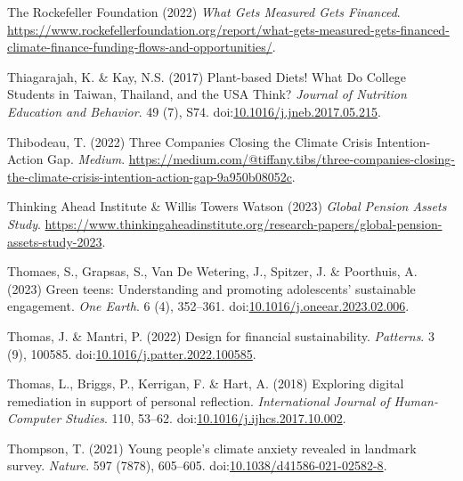 \documentclass[
  letterpaper,
  DIV=11,
  numbers=noendperiod]{scrartcl}
\newlength{\cslhangindent}
\newenvironment{CSLReferences}[2] %
 {\begin{list}{}{%
  \setlength{\itemindent}{0pt}
  \setlength{\leftmargin}{0pt}
  \setlength{\parsep}{0pt}
  \ifodd #1
   \setlength{\leftmargin}{\cslhangindent}
   \setlength{\itemindent}{-1\cslhangindent}
  \fi
  \setlength{\itemsep}{#2\baselineskip}}}
 {\end{list}}
\begin{document}
\begin{CSLReferences}{0}{1}
The Rockefeller Foundation (2022) \emph{What {Gets Measured Gets
Financed}}.
\url{https://www.rockefellerfoundation.org/report/what-gets-measured-gets-financed-climate-finance-funding-flows-and-opportunities/}.

Thiagarajah, K. \& Kay, N.S. (2017) Plant-based {Diets}! {What Do
College Students} in {Taiwan}, {Thailand}, and the {USA Think}?
\emph{Journal of Nutrition Education and Behavior}. 49 (7), S74.
doi:\href{https://doi.org/10.1016/j.jneb.2017.05.215}{10.1016/j.jneb.2017.05.215}.

Thibodeau, T. (2022) Three {Companies Closing} the {Climate Crisis
Intention-Action Gap}. \emph{Medium}.
\url{https://medium.com/@tiffany.tibs/three-companies-closing-the-climate-crisis-intention-action-gap-9a950b08052c}.

Thinking Ahead Institute \& Willis Towers Watson (2023) \emph{Global
{Pension Assets Study}}.
\url{https://www.thinkingaheadinstitute.org/research-papers/global-pension-assets-study-2023}.

Thomaes, S., Grapsas, S., Van De Wetering, J., Spitzer, J. \& Poorthuis,
A. (2023) Green teens: {Understanding} and promoting adolescents'
sustainable engagement. \emph{One Earth}. 6 (4), 352--361.
doi:\href{https://doi.org/10.1016/j.oneear.2023.02.006}{10.1016/j.oneear.2023.02.006}.

Thomas, J. \& Mantri, P. (2022) Design for financial sustainability.
\emph{Patterns}. 3 (9), 100585.
doi:\href{https://doi.org/10.1016/j.patter.2022.100585}{10.1016/j.patter.2022.100585}.

Thomas, L., Briggs, P., Kerrigan, F. \& Hart, A. (2018) Exploring
digital remediation in support of personal reflection.
\emph{International Journal of Human-Computer Studies}. 110, 53--62.
doi:\href{https://doi.org/10.1016/j.ijhcs.2017.10.002}{10.1016/j.ijhcs.2017.10.002}.

Thompson, T. (2021) Young people's climate anxiety revealed in landmark
survey. \emph{Nature}. 597 (7878), 605--605.
doi:\href{https://doi.org/10.1038/d41586-021-02582-8}{10.1038/d41586-021-02582-8}.


\end{CSLReferences}
\end{document}
